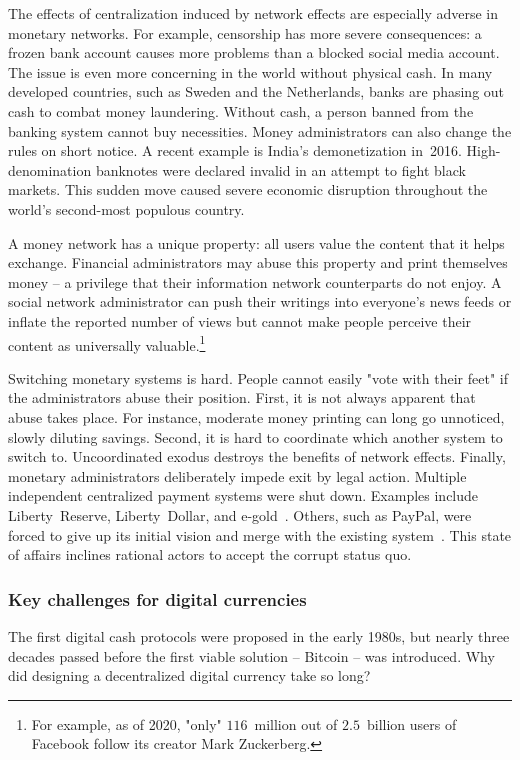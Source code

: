 The effects of centralization induced by network effects are especially adverse in monetary networks.
For example, censorship has more severe consequences: a frozen bank account causes more problems than a blocked social media account.
The issue is even more concerning in the world without physical cash.
In many developed countries, such as Sweden and the Netherlands, banks are phasing out cash to combat money laundering.
Without cash, a person banned from the banking system cannot buy necessities.
Money administrators can also change the rules on short notice.
A recent example is India's demonetization in~2016.
High-denomination banknotes were declared invalid in an attempt to fight black markets.
This sudden move caused severe economic disruption throughout the world's second-most populous country.

A money network has a unique property: all users value the content that it helps exchange.
Financial administrators may abuse this property and print themselves money -- a privilege that their information network counterparts do not enjoy.
A social network administrator can push their writings into everyone's news feeds or inflate the reported number of views but cannot make people perceive their content as universally valuable.\footnote{For example, as of 2020, "only" $116$~million out of $2.5$~billion users of Facebook follow its creator Mark Zuckerberg.}

Switching monetary systems is hard.
People cannot easily "vote with their feet" if the administrators abuse their position.
First, it is not always apparent that abuse takes place.
For instance, moderate money printing can long go unnoticed, slowly diluting savings.
Second, it is hard to coordinate which another system to switch to.
Uncoordinated exodus destroys the benefits of network effects.
Finally, monetary administrators deliberately impede exit by legal action.
Multiple independent centralized payment systems were shut down.
Examples include Liberty~Reserve, Liberty~Dollar, and e-gold~\cite{White2014, Trautman2014}.
Others, such as PayPal, were forced to give up its initial vision and merge with the existing system~\cite{Jackson2017}.
This state of affairs inclines rational actors to accept the corrupt status quo.


\subsubsection*{Key challenges for digital currencies}

The first digital cash protocols were proposed in the early 1980s, but nearly three decades passed before the first viable solution -- Bitcoin -- was introduced.
Why did designing a decentralized digital currency take so long?

